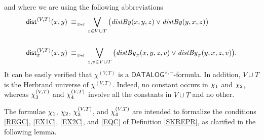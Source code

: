 \documentclass[a4paper]{llncs}
\newcommand{\DisjDatalog}{\ensuremath{\mathsf{DATALOG}^{\vee,\neg}}\xspace}
\newcommand{\ForallpizeroDisjDatalog}{\ensuremath{\mathbf{\forall_{0,D\vee}^{\pi}}}\xspace}
\newcommand{\pairin}[3]{\left[#1,#2\right] \in #3}
\newcommand{\nonpairin}[2]{#1 \in \bar{\pi}(#2)}
\newcommand{\seteq}[2]{#1=#2}
\begin{document}
and where we are using the following abbreviations
\begin{align*}
%
\distS^{(V,T)}(x,y) \equivAs {} & \bigvee\limits_{z \in V \cup 
T}\big(\distby{x}{y}{z} \vee \distby{y}{x}{z}\big) \\ \\
%
\distPS^{(V,T)}(x,y) \equivAs {} & \bigvee\limits_{z,v \in V \cup 
T}\big(\distPby{x}{y}{z}{v} \vee \distPby{y}{x}{z}{v}\big) .
\end{align*}
%
It can be easily verified that $\chi^{(V,T)}$ is a
$\DisjDatalog$-formula. In addition, $V \cup T$ is the Herbrand
universe of $\chi^{(V,T)}$. Indeed, no constant occurs in
$\chi_1$ and $\chi_2$, whereas $\chi_3^{(V,T)}$ and $\chi_4^{(V,T)}$ involve
all the constants in $V \cup T$ and no other.

% 
%
The formulae $\chi_1$, $\chi_2$, $\chi_3^{(V,T)}$, and $\chi_4^{(V,T)}$ are intended 
to formalize the conditions \ref{REGC}, \ref{EX1C}, \ref{EX2C}, and 
\ref{EQC} of
Definition \ref{SKREPR}, as clarified in the following lemma.
\end{document}
